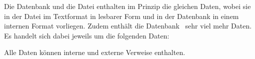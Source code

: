 Die Datenbank und die Datei enthalten im Prinzip die gleichen Daten, wobei sie in der Datei im Textformat in lesbarer Form und in der Datenbank in einem internen Format vorliegen.
Zudem enthält die Datenbank \textiAlg\ sehr viel mehr Daten.
Es handelt sich dabei jeweils um die folgenden Daten:
\begin{description}
	\item[]         \label{Daten:Axiom}         
	\item[]         \label{Daten:Satz}          
	\item[]        \label{Daten:Beweis}        
	\item[]   \label{Daten:Fachbegriff}   
	\item[]    \label{Daten:Fachgebiet}    
	\item[]\label{Daten:Ausgabeschema} 
	\item[]   \label{Daten:Auswertung}    
\end{description}
Alle Daten können interne und externe Verweise enthalten.

